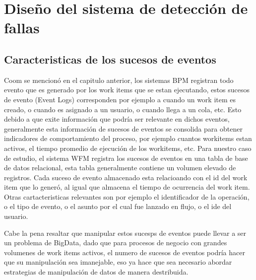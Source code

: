 
\chapter{Diseño del sistema de detección de fallas}

\ifpdf
    \graphicspath{{Chapter2/Figs/Raster/}{Chapter2/Figs/PDF/}{Chapter2/Figs/}}
\else
    \graphicspath{{Chapter2/Figs/Vector/}{Chapter2/Figs/}}
\fi


\section{Caracteristicas de los sucesos de eventos} %
\label{section2.1}

Coom se mencionó en el capitulo anterior, los sistemas BPM registran todo evento que es generado por los work items que se estan ejecutando, estos sucesos de evento (Event Logs) corresponden por ejemplo a cuando un work item es creado, o cuando es asignado a un usuario, o cuando llega a un cola, etc. Esto debido a que exite información que podría ser relevante en dichos eventos, generalmente esta información de sucesos de eventos se consolida para obtener indicadores de comportamiento del proceso, por ejemplo cuantos workitems estan activos, el tiempo promedio de ejecución de los workitems, etc. Para nuestro caso de estudio, el sistema WFM registra los sucesos de eventos en una tabla de base de datos relacional, esta tabla generalmente contiene un volumen elevado de registros. Cada suceso de evento almacenado esta relacioando con el id del work item que lo generó, al igual que almacena el tiempo de ocurrencia del work item. Otras cartacteristicas relevantes son por ejemplo el identificador de la operación, o el tipo de evento, o el asunto por el cual fue lanzado en flujo, o el ide del usuario.

Cabe la pena resaltar que manipular estos sucesps de eventos puede llevar a ser un problema de BigData, dado que para procesos de negocio con grandes volumenes de work items activos, el numero de sucesos de eventos podría hacer que su manipulación sea imanejable, eso ya hace que sea necesario abordar estrategias de manipulación de datos de manera destribuida.

